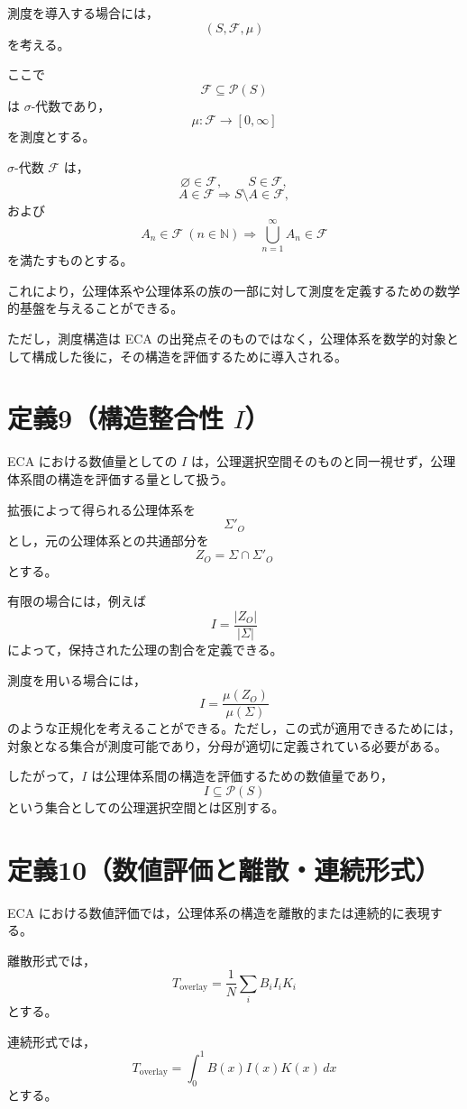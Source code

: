 \documentclass[a4paper,12pt]{article}
\begin{document}
測度を導入する場合には，
\[
(S,\mathcal{F},\mu)
\]
を考える。

ここで
\[
\mathcal{F}\subseteq\mathcal{P}(S)
\]
は $\sigma$-代数であり，
\[
\mu:\mathcal{F}\to[0,\infty]
\]
を測度とする。

$\sigma$-代数 $\mathcal{F}$ は，
\[
\varnothing\in\mathcal{F},
\qquad
S\in\mathcal{F},
\]
\[
A\in\mathcal{F}
\Longrightarrow
S\setminus A\in\mathcal{F},
\]
および
\[
A_n\in\mathcal{F}\ (n\in\mathbb{N})
\Longrightarrow
\bigcup_{n=1}^{\infty}A_n\in\mathcal{F}
\]
を満たすものとする。

これにより，公理体系や公理体系の族の一部に対して測度を定義するための数学的基盤を与えることができる。

ただし，測度構造は ECA の出発点そのものではなく，公理体系を数学的対象として構成した後に，その構造を評価するために導入される。

\section{定義9（構造整合性 $I$）}

ECA における数値量としての $I$ は，公理選択空間そのものと同一視せず，公理体系間の構造を評価する量として扱う。

拡張によって得られる公理体系を
\[
\Sigma'_O
\]
とし，元の公理体系との共通部分を
\[
Z_O=\Sigma\cap\Sigma'_O
\]
とする。

有限の場合には，例えば
\[
I=
\frac{|Z_O|}{|\Sigma|}
\]
によって，保持された公理の割合を定義できる。

測度を用いる場合には，
\[
I=
\frac{\mu(Z_O)}{\mu(\Sigma)}
\]
のような正規化を考えることができる。ただし，この式が適用できるためには，対象となる集合が測度可能であり，分母が適切に定義されている必要がある。

したがって，$I$ は公理体系間の構造を評価するための数値量であり，
\[
I\subseteq\mathcal{P}(S)
\]
という集合としての公理選択空間とは区別する。

\section{定義10（数値評価と離散・連続形式）}

ECA における数値評価では，公理体系の構造を離散的または連続的に表現する。

離散形式では，
\[
T_{\mathrm{overlay}}
=
\frac{1}{N}
\sum_i B_i I_i K_i
\]
とする。

連続形式では，
\[
T_{\mathrm{overlay}}
=
\int_0^1 B(x)I(x)K(x)\,dx
\]
とする。
\end{document}
